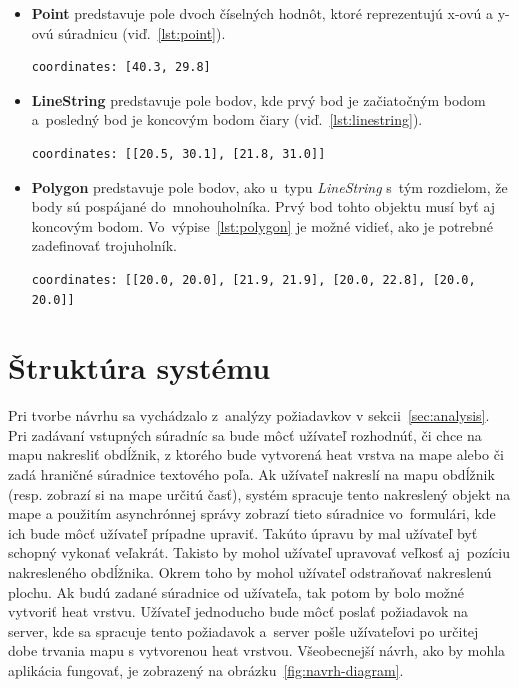 \begin{itemize}
\item \textbf{Point} predstavuje pole dvoch číselných hodnôt, ktoré reprezentujú x-ovú a y-ovú súradnicu (viď.~\ref{lst:point}).

\begin{lstlisting}
coordinates: [40.3, 29.8]
\end{lstlisting}

\item \textbf{LineString} predstavuje pole bodov, kde prvý bod je začiatočným bodom a~posledný bod je koncovým bodom čiary (viď.~\ref{lst:linestring}).

\begin{lstlisting}
coordinates: [[20.5, 30.1], [21.8, 31.0]]
\end{lstlisting}

\item \textbf{Polygon} predstavuje pole bodov, ako u~typu \emph{LineString} s~tým rozdielom, že body sú pospájané do~mnohouholníka. Prvý bod tohto objektu musí byť aj koncovým bodom. Vo~výpise~\ref{lst:polygon} je možné vidieť, ako je potrebné zadefinovať trojuholník.

\begin{lstlisting}
coordinates: [[20.0, 20.0], [21.9, 21.9], [20.0, 22.8], [20.0, 20.0]]
\end{lstlisting}
\end{itemize}


\section{Štruktúra systému}
Pri tvorbe návrhu sa vychádzalo z~analýzy požiadavkov v sekcii~\ref{sec:analysis}. Pri zadávaní vstupných súradníc sa bude môcť užívateľ rozhodnúť, či chce na mapu nakresliť obdĺžnik, z ktorého bude vytvorená heat vrstva na mape alebo či zadá hraničné súradnice textového poľa. Ak užívateľ nakreslí na mapu obdĺžnik (resp. zobrazí si na mape určitú časť), systém spracuje tento nakreslený objekt na mape a použitím asynchrónnej správy zobrazí tieto súradnice vo~formulári, kde ich bude môcť užívateľ prípadne upraviť. Takúto úpravu by mal užívateľ byť schopný vykonať veľakrát. Takisto by mohol užívateľ upravovať veľkosť aj~pozíciu nakresleného obdĺžnika. Okrem toho by mohol užívateľ odstraňovať nakreslenú plochu. Ak budú zadané súradnice od užívateľa, tak potom by bolo možné vytvoriť heat vrstvu. Užívateľ jednoducho bude môcť poslať požiadavok na server, kde sa spracuje tento požiadavok a~server pošle užívateľovi po určitej dobe trvania mapu s vytvorenou heat vrstvou. Všeobecnejší návrh, ako by mohla aplikácia fungovať, je zobrazený na obrázku~\ref{fig:navrh-diagram}.


